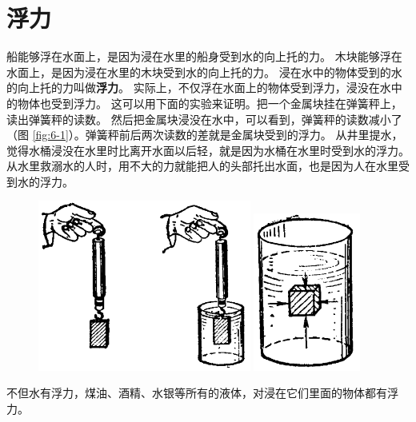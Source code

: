 \section{浮力}\label{sec:6-1}

船能够浮在水面上，是因为浸在水里的船身受到水的向上托的力。
木块能够浮在水面上，是因为浸在水里的木块受到水的向上托的力。
浸在水中的物体受到的水的向上托的力叫做\textbf{浮力}。
实际上，不仅浮在水面上的物体受到浮力，浸没在水中的物体也受到浮力。
这可以用下面的实验来证明。把一个金属块挂在弹簧秤上，读出弹簧秤的读数。
然后把金属块浸没在水中，可以看到，弹簧秤的读数减小了（图 \ref{fig:6-1}）。弹簧秤前后两次读数的差就是金属块受到的浮力。
从井里提水，觉得水桶浸没在水里时比离开水面以后轻，就是因为水桶在水里时受到水的浮力。
从水里救溺水的人时，用不大的力就能把人的头部托出水面，也是因为人在水里受到水的浮力。

\begin{figure}[htbp]
    \centering
    \begin{minipage}{7cm}
    \centering
    \includegraphics[width=7cm]{../pic/czwl1-ch6-1}
    \caption{}\label{fig:6-1}
    \end{minipage}
    \qquad
    \begin{minipage}{7cm}
    \centering
    \includegraphics[width=3.5cm]{../pic/czwl1-ch6-2}
    \caption{}\label{fig:6-2}
    \end{minipage}
\end{figure}

不但水有浮力，煤油、酒精、水银等所有的液体，对浸在它们里面的物体都有浮力。

